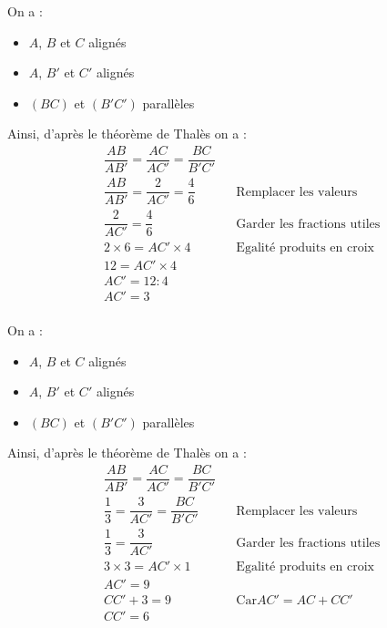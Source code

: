 \newpage


\begin{multicols}{2}
  \cnt On a :\\
  \begin{itemize}
    \item $A$, $B$ et $C$ alignés
    \item $A$, $B'$ et $C'$ alignés
    \item $(BC)$ et $(B'C')$ parallèles
  \end{itemize}
  Ainsi, d'après le théorème de Thalès on a :
  \begin{align*}
    &\dfrac{AB}{AB'}=\dfrac{AC}{AC'}=\dfrac{BC}{B'C'}&&\\
    &\dfrac{AB}{AB'}=\dfrac{2}{AC'}=\dfrac{4}{6}&&\text{Remplacer les valeurs}\\
    &\dfrac{2}{AC'}=\dfrac{4}{6}&&\text{Garder les fractions utiles}\\
    &2\times 6=AC'\times 4 &&\text{Egalité produits en croix}\\
    &12=AC'\times 4 &&\\
    &AC'=12:4&&\\
    &AC'=3&&
  \end{align*}
  \columnbreak\\
  \cnt On a :\\
  \begin{itemize}
    \item $A$, $B$ et $C$ alignés
    \item $A$, $B'$ et $C'$ alignés
    \item $(BC)$ et $(B'C')$ parallèles
  \end{itemize}
  Ainsi, d'après le théorème de Thalès on a :
  \begin{align*}
    &\dfrac{AB}{AB'}=\dfrac{AC}{AC'}=\dfrac{BC}{B'C'}&&\\
    &\dfrac{1}{3}=\dfrac{3}{AC'}=\dfrac{BC}{B'C'}&&\text{Remplacer les valeurs}\\
    &\dfrac{1}{3}=\dfrac{3}{AC'} &&\text{Garder les fractions utiles}\\
    &3\times 3=AC'\times 1&&\text{Egalité produits en croix}\\
    &AC'=9 &&\\
    &CC'+3=9&&\text{Car}AC'=AC+CC'\\
    &CC'=6&&
  \end{align*}
\end{multicols}

